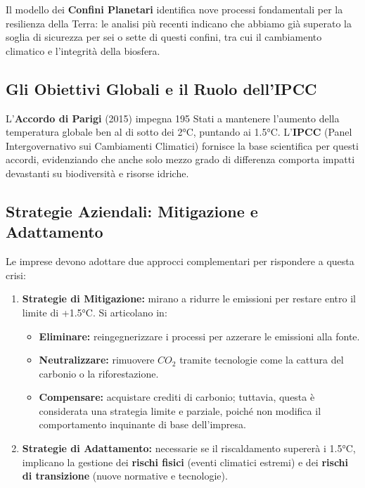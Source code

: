 \documentclass[a4paper,10pt]{article}
\begin{document}
Il modello dei \textbf{Confini Planetari} identifica nove processi fondamentali per la resilienza della Terra: le analisi più recenti indicano che abbiamo già superato la soglia di sicurezza per sei o sette di questi confini, tra cui il cambiamento climatico e l'integrità della biosfera.

\subsection*{Gli Obiettivi Globali e il Ruolo dell'IPCC}

L'\textbf{Accordo di Parigi} (2015) impegna 195 Stati a mantenere l'aumento della temperatura globale ben al di sotto dei 2°C, puntando ai 1.5°C. L'\textbf{IPCC} (Panel Intergovernativo sui Cambiamenti Climatici) fornisce la base scientifica per questi accordi, evidenziando che anche solo mezzo grado di differenza comporta impatti devastanti su biodiversità e risorse idriche.

\subsection*{Strategie Aziendali: Mitigazione e Adattamento}

Le imprese devono adottare due approcci complementari per rispondere a questa crisi:

\begin{enumerate}
    \item \textbf{Strategie di Mitigazione:} mirano a ridurre le emissioni per restare entro il limite di +1.5°C. Si articolano in:
    \begin{itemize}
        \item \textbf{Eliminare:} reingegnerizzare i processi per azzerare le emissioni alla fonte.
        \item \textbf{Neutralizzare:} rimuovere $CO_2$ tramite tecnologie come la cattura del carbonio o la riforestazione.
        \item \textbf{Compensare:} acquistare crediti di carbonio; tuttavia, questa è considerata una strategia limite e parziale, poiché non modifica il comportamento inquinante di base dell'impresa.
    \end{itemize}
    \item \textbf{Strategie di Adattamento:} necessarie se il riscaldamento supererà i 1.5°C, implicano la gestione dei \textbf{rischi fisici} (eventi climatici estremi) e dei \textbf{rischi di transizione} (nuove normative e tecnologie).
\end{enumerate}
\end{document}
